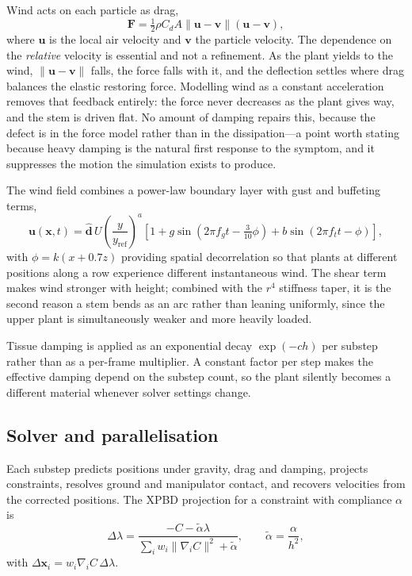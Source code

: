 \documentclass[conference]{IEEEtran}
\begin{document}
Wind acts on each particle as drag,
\begin{equation}
\mathbf{F} = \tfrac{1}{2}\rho C_d A
             \lVert \mathbf{u}-\mathbf{v} \rVert (\mathbf{u}-\mathbf{v}),
\label{eq:drag}
\end{equation}
where $\mathbf{u}$ is the local air velocity and $\mathbf{v}$ the particle
velocity. The dependence on the \emph{relative} velocity is essential and not
a refinement. As the plant yields to the wind, $\lVert\mathbf{u}-\mathbf{v}\rVert$
falls, the force falls with it, and the deflection settles where drag balances
the elastic restoring force. Modelling wind as a constant acceleration removes
that feedback entirely: the force never decreases as the plant gives way, and
the stem is driven flat. No amount of damping repairs this, because the defect
is in the force model rather than in the dissipation---a point worth stating
because heavy damping is the natural first response to the symptom, and it
suppresses the motion the simulation exists to produce.

The wind field combines a power-law boundary layer with gust and buffeting
terms,
\begin{equation}
\mathbf{u}(\mathbf{x},t) = \hat{\mathbf{d}}\,U
  \left(\frac{y}{y_\text{ref}}\right)^{\!a}
  \left[1 + g\sin(2\pi f_g t - \tfrac{3}{10}\phi)
          + b\sin(2\pi f_t t - \phi)\right],
\end{equation}
with $\phi = k(x + 0.7z)$ providing spatial decorrelation so that plants at
different positions along a row experience different instantaneous wind. The
shear term makes wind stronger with height; combined with the $r^4$ stiffness
taper, it is the second reason a stem bends as an arc rather than leaning
uniformly, since the upper plant is simultaneously weaker and more heavily
loaded.

Tissue damping is applied as an exponential decay $\exp(-ch)$ per substep
rather than as a per-frame multiplier. A constant factor per step makes the
effective damping depend on the substep count, so the plant silently becomes a
different material whenever solver settings change.



\subsection{Solver and parallelisation}
\label{sec:solver}

Each substep predicts positions under gravity, drag and damping, projects
constraints, resolves ground and manipulator contact, and recovers velocities
from the corrected positions. The XPBD projection for a constraint with
compliance $\alpha$ is
\begin{equation}
\Delta\lambda = \frac{-C - \tilde{\alpha}\lambda}
                     {\sum_i w_i \lVert\nabla_i C\rVert^2 + \tilde{\alpha}},
\qquad \tilde{\alpha} = \frac{\alpha}{h^2},
\end{equation}
with $\Delta\mathbf{x}_i = w_i \nabla_i C \, \Delta\lambda$.
\end{document}
